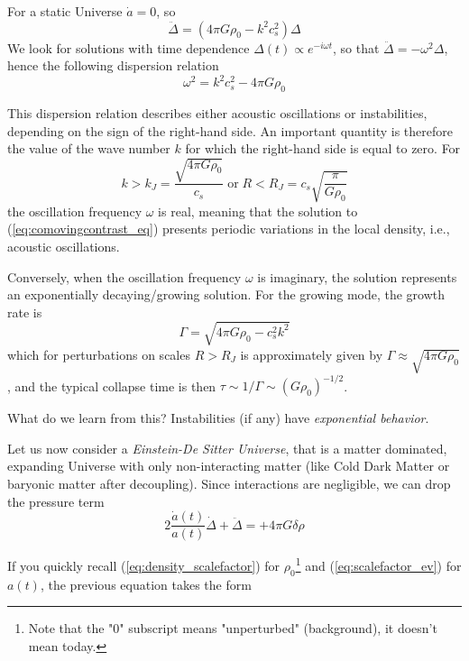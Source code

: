 \par For a static Universe $\dot{a} = 0$, so
\begin{equation*}
    \ddot{\Delta} = (4\pi G\rho_{0}-k^{2}c_{s}^{2})\Delta
\end{equation*}
We look for solutions with time dependence $\Delta(t)\propto e^{-i\omega t}$, so that $\ddot{\Delta} = -\omega^{2}\Delta$, hence the following dispersion relation
\begin{equation}
    \omega^{2} = k^{2}c_{s}^{2}-4\pi G\rho_{0}
    \label{eq:su_disprel}
\end{equation}
\par This dispersion relation describes either acoustic oscillations or instabilities, depending on the sign of the right-hand side. An important quantity is therefore the value of the wave number $k$ for which the right-hand side is equal to zero. For
\begin{equation}
    k > k_{J} = \frac{\sqrt{4\pi G \rho_{0}}}{c_{s}} \; \text{or}\; R < R_{J} = c_{s}\sqrt{\frac{\pi}{G\rho_{0}}}
    \label{eq:jeanslength}
\end{equation}
the oscillation frequency $\omega$ is real, meaning that the solution to (\ref{eq:comovingcontrast_eq}) presents periodic variations in the local density, i.e., acoustic oscillations.
\par Conversely, when the oscillation frequency $\omega$ is imaginary, the solution represents an exponentially decaying/growing solution. For the growing mode, the growth rate is
$$ \Gamma = \sqrt{4\pi G \rho_{0} - c_{s}^{2}k^{2}} $$
which for perturbations on scales $R > R_{J}$ is approximately given by $\Gamma \approx \sqrt{4\pi G \rho_{0}}$, and the typical collapse time is then $\tau \sim 1/\Gamma \sim (G\rho_{0})^{-1/2}$.
\par What do we learn from this? Instabilities (if any) have \emph{exponential behavior}.
\par Let us now consider a \emph{Einstein-De Sitter Universe}, that is a matter dominated, expanding Universe with only non-interacting matter
(like Cold Dark Matter or baryonic matter after decoupling). Since interactions are negligible, we can drop the pressure term
\begin{equation*}
    2\frac{\dot{a}(t)}{a(t)}\dot{\Delta}+\ddot{\Delta} = +4\pi G\delta\rho
\end{equation*}
\par If you quickly recall (\ref{eq:density_scalefactor}) for $\rho_{0}$\footnote{Note that the "0" subscript means "unperturbed" (background), it doesn’t mean today.} and (\ref{eq:scalefactor_ev}) for $a(t)$, the previous equation takes the form
